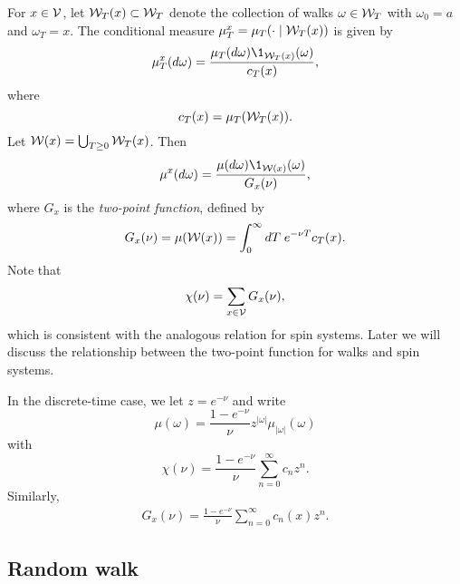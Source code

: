 For $x \in \mathcal{V}$, let $\mathcal{W}_T(x) \subset \mathcal{W}_T$ denote the collection of walks
$\omega \in \mathcal{W}_T$ with $\omega_0 = a$ and $\omega_T = x$.
The conditional measure $\mu^x_T = \mu_T(\cdot \mid \mathcal{W}_T(x))$
is given by
\begin{equation}
\mu^x_T(d\omega) = \frac{\mu_T(d\omega) \1_{\Wcal_T(x)}(\omega)}{c_T(x)},
\end{equation}
where
\begin{equation}
c_T(x) = \mu_T(\mathcal{W}_T(x)).
\end{equation}
Let $\mathcal{W}(x) = \bigcup_{T \ge 0} \mathcal{W}_T(x)$. Then
\begin{equation}
\mu^x(d\omega) = \frac{\mu(d\omega) \1_{\Wcal(x)}(\omega)}{G_x(\nu)},
\end{equation}
where $G_x$ is the \emph{two-point function}, defined by
\begin{equation}
G_x(\nu) = \mu(\mathcal{W}(x)) = \int_0^\infty dT \; e^{-\nu T} c_T(x).
\end{equation}
Note that
\begin{equation}
\chi(\nu) = \sum_{x\in\mathcal{V}} G_x(\nu),
\end{equation}
which is consistent with the analogous relation for spin systems.
Later we will discuss the relationship between the two-point function for
walks and spin systems.

\begin{rk}
In the discrete-time case, we let $z = e^{-\nu}$ and write
\begin{equation}
\mu(\omega)
  =
\frac{1 - e^{-\nu}}{\nu} z^{|\omega|} \mu_{|\omega|}(\omega)
\end{equation}
with
\begin{equation}
\chi(\nu) = \frac{1 - e^{-\nu}}{\nu} \sum_{n=0}^\infty c_n z^n.
\end{equation}
Similarly,
\begin{align}
G_x(\nu) = \frac{1 - e^{-\nu}}{\nu} \sum_{n=0}^\infty c_n(x) z^n.
\end{align}
\end{rk}


\subsection{Random walk}

